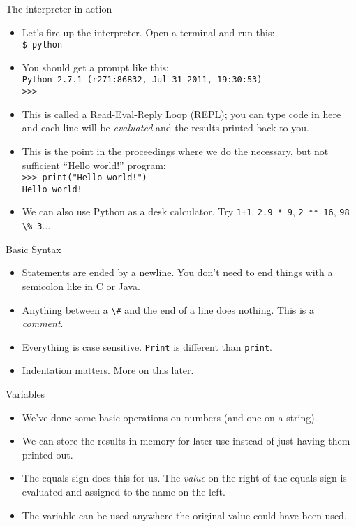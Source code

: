 \documentclass{beamer}
\begin{document}
\begin{frame}{The interpreter in action}
  \begin{itemize}
    \item Let's fire up the interpreter. Open a terminal and run this: \\
      \texttt{\$ python}
    \item You should get a prompt like this: \\
      \texttt{Python 2.7.1 (r271:86832, Jul 31 2011, 19:30:53) \\ >>>} 
    \item This is called a Read-Eval-Reply Loop (REPL); you can type code in here and each line will be \emph{evaluated} and the results printed back to you.
    \item This is the point in the proceedings where we do the necessary, but not sufficient ``Hello world!'' program: \\
      \texttt{>>> print("Hello world!")\\Hello world!}
    \item We can also use Python as a desk calculator. Try \lstinline{1+1}, \lstinline{2.9 * 9}, \lstinline{2 ** 16}, \lstinline{98 \% 3}...
  \end{itemize}
\end{frame}

\begin{frame}{Basic Syntax}
  \begin{itemize}
    \item Statements are ended by a newline. You don't need to end things with a semicolon like in C or Java.
    \item Anything between a \lstinline!\#! and the end of a line does nothing. This is a \emph{comment}.
    \item Everything is case sensitive. \lstinline{Print} is different than \lstinline{print}.
    \item Indentation matters. More on this later.
  \end{itemize}
\end{frame}

\begin{frame}{Variables}
  \begin{itemize}
    \item We've done some basic operations on numbers (and one on a string).
    \item We can store the results in memory for later use instead of just having them printed out.
    \item The equals sign does this for us. The \emph{value} on the right of the equals sign is evaluated and assigned to the name on the left.
    \item The variable can be used anywhere the original value could have been used.
  \end{itemize}
\end{frame}
\end{document}
